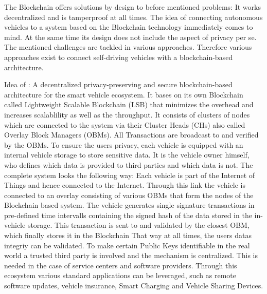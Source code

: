 The Blockchain offers solutions by design to before mentioned problems: It works decentralized and is tamperproof at all times. The idea of connecting autonomous vehicles to a system based on the Blockchain technology immediately comes to mind.
At the same time its design does not include the aspect of privacy per se. The mentioned challenges are tackled in various approaches. Therefore various approaches exist to connect self-driving vehicles with a blockchain-based architecture.

Idea of \citeauthor{DorriSteger2017}: A decentralized privacy-preserving and secure blockchain-based architecture for the smart vehicle ecosystem. It bases on its own Blockchain called Lightweight Scalable Blockchain (LSB) that minimizes the overhead and increases scalablility as well as the throughput.
It consists of clusters of nodes which are connected to the system via their Cluster Heads (CHs) also called Overlay Block Managers (OBMs).  All Transactions are broadcast to and verified by the OBMs. 
To ensure the users privacy, each vehicle is equipped with an internal vehicle storage to store sensitive data. It is the vehicle owner himself, who defines which data is provided to third parties and which data is not.
The complete system looks the following way: Each vehicle is part of the Internet of Things and hence connected to the Internet. Through this link the vehicle is connected to an overlay consisting of various OBMs that form the nodes of the Blockchain based system.
The vehicle generates single signature transactions in pre-defined time intervalls containing the signed hash of the data stored in the in-vehicle storage. This transaction is sent to and validated by the closest OBM, which finally stores it in the Blockchain That way at all times, the users datas integriy can be validated.
To make certain Public Keys identifiable in the real world a trusted third party is involved and the mechanism is centralized. This is needed in the case of service centers and software providers.
Through this ecosystem various standard applications can be leveraged, such as remote software updates, vehicle insurance, Smart Charging and Vehicle Sharing Devices.


